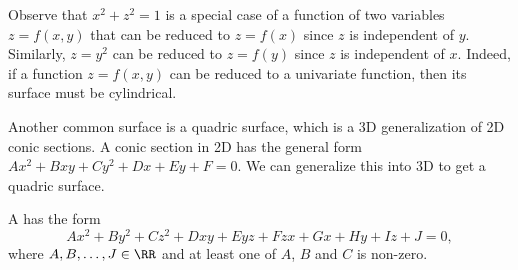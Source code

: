 \begin{figure}[H]
    \centering
    \noindent\begin{minipage}[t]{.5\textwidth}
      \centering
    \end{minipage}%
    \begin{minipage}[t]{.5\textwidth}
      \centering
    \end{minipage}
\end{figure}

Observe that $x^2 + z^2 = 1$ is a special case of a function of two variables $z = f(x, y)$ that can be reduced to $z = f(x)$ since $z$ is independent of $y$. Similarly, $z = y^2$ can be reduced to $z = f(y)$ since $z$ is independent of $x$. Indeed, if a function $z = f(x, y)$ can be reduced to a univariate function, then its surface must be cylindrical.

Another common surface is a quadric surface, which is a 3D generalization of 2D conic sections. A conic section in 2D has the general form $Ax^2 + Bxy + Cy^2 + Dx + Ey + F = 0$. We can generalize this into 3D to get a quadric surface.

\begin{definition}
    A  has the form \[Ax^2 + By^2 + Cz^2 + Dxy + Eyz + Fzx + Gx + Hy + Iz + J = 0,\] where $A, B, \dots, J \in \RR$ and at least one of $A$, $B$ and $C$ is non-zero.
\end{definition}

